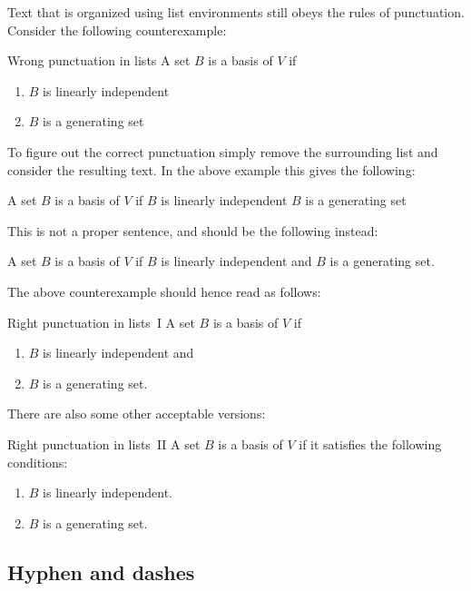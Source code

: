 Text that is organized using list environments still obeys the rules of punctuation.
Consider the following counterexample:
\begin{showlatex}{Wrong punctuation in lists}
  A set $B$ is a basis of $V$ if
  \begin{enumerate}
    \item
      $B$ is linearly independent
    \item
      $B$ is a generating set
  \end{enumerate}
\end{showlatex}
To figure out the correct punctuation simply remove the surrounding list and consider the resulting text.
In the above example this gives the following:
\begin{center}
  A set $B$ is a basis of $V$ if $B$ is linearly independent $B$ is a generating set
\end{center}
This is not a proper sentence, and should be the following instead:
\begin{center}
  A set $B$ is a basis of $V$ if $B$ is linearly independent and $B$ is a generating set.
\end{center}
The above counterexample should hence read as follows:
\begin{showlatex}{Right punctuation in lists~I}
  A set $B$ is a basis of $V$ if
  \begin{enumerate}
    \item
      $B$ is linearly independent and
    \item
      $B$ is a generating set.
  \end{enumerate}
\end{showlatex}
There are also some other acceptable versions:
\begin{showlatex}{Right punctuation in lists~II}
  A set $B$ is a basis of $V$ if it satisfies the following conditions:
  \begin{enumerate}
    \item
      $B$ is linearly independent.
    \item
      $B$ is a generating set.
  \end{enumerate}
\end{showlatex}




\subsection{Hyphen and dashes}

